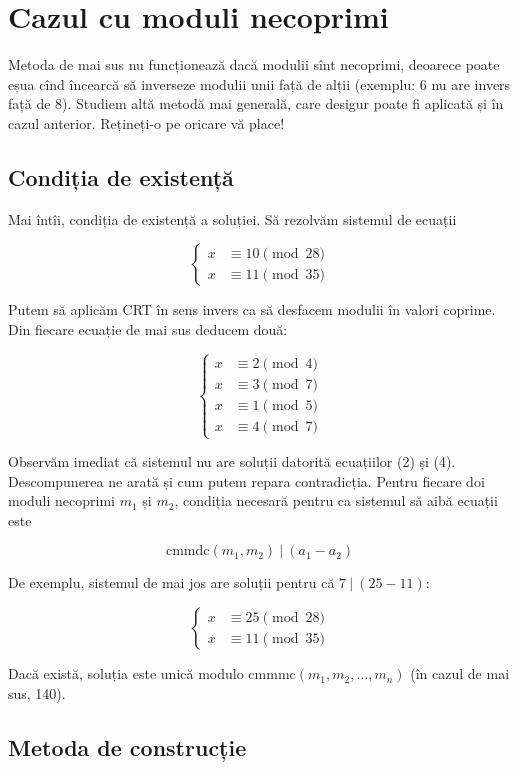 \documentclass[../main.tex]{subfiles}
\begin{document}
\section{Cazul cu moduli necoprimi}

Metoda de mai sus nu funcționează dacă modulii sînt necoprimi, deoarece poate eșua cînd încearcă să inverseze modulii unii față de alții (exemplu: 6 nu are invers față de 8). Studiem altă metodă mai generală, care desigur poate fi aplicată și în cazul anterior. Rețineți-o pe oricare vă place!

\subsection{Condiția de existență}

Mai întîi, condiția de existență a soluției. Să rezolvăm sistemul de ecuații

$$
\begin{cases}
x &\equiv 10 \pmod{28}\\
x &\equiv 11 \pmod{35}
\end{cases}
$$

Putem să aplicăm CRT în sens invers ca să desfacem modulii în valori coprime. Din fiecare ecuație de mai sus deducem două:

$$
\begin{cases}
x &\equiv 2 \pmod{4}\\
x &\equiv 3 \pmod{7}\\
x &\equiv 1 \pmod{5}\\
x &\equiv 4 \pmod{7}
\end{cases}
$$

Observăm imediat că sistemul nu are soluții datorită ecuațiilor (2) și (4). Descompunerea ne arată și cum putem repara contradicția. Pentru fiecare doi moduli necoprimi $m_1$ și $m_2$, condiția necesară pentru ca sistemul să aibă ecuații este

$$
\text{cmmdc}(m_1, m_2) \ | \ (a_1 - a_2)
$$

De exemplu, sistemul de mai jos are soluții pentru că $7 \ | \ (25-11)$:

$$
\begin{cases}
x &\equiv 25 \pmod{28}\\
x &\equiv 11 \pmod{35}
\end{cases}
$$

Dacă există, soluția este unică modulo $\text{cmmmc}(m_1, m_2, \dots, m_n)$ (în cazul de mai sus, 140).

\subsection{Metoda de construcție}
\end{document}
